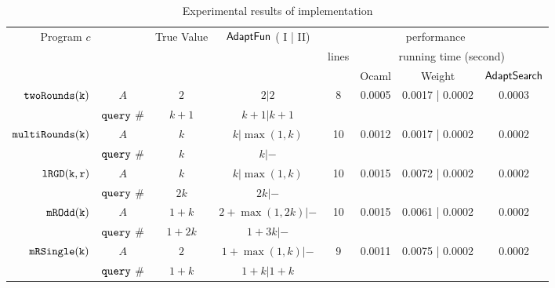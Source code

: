 
\begin {table}[H]
\vspace{-0.5cm}
    \caption{Experimental results of {\THESYSTEM} implementation}
    \vspace{-0.5cm}
        \label{tb:adapt-imp-detail}
        \begin{center}
        \centering
{\scriptsize
        \begin{tabular}{ r | c | c | c | c | c | c | c  }
        \multirow{3}{*}{Program $c$} & 
        \multirow{3}{*}{}
         & True Value
         & {$\textsf{AdaptFun}$ ( I | II)}
         & \multicolumn{4}{c}{performance} \\ 
         \cline{5-8}
         & & \multirow{2}{*}{ } & \multirow{2}{*}{} & \multirow{2}{*}{lines} & \multicolumn{3}{c}{running time (second)} \\ 
         \cline{6-8}
         & & & &  & Ocaml & Weight & $\mathsf{AdaptSearch}$  \\
         \hline \hline
         \multirow{2}{*}{$\mathtt{twoRounds(k)}$}  
         & $A$ &  $2$ & $2| 2$  & \multirow{2}{*}{8} & \multirow{2}{*}{0.0005} & \multirow{2}{*}{0.0017 | 0.0002} & \multirow{2}{*}{0.0003} \\
         \cline{2-4}
         & ${\tt query}$ \#   &  $k + 1$ & $k+1 | k+1$  & & & & \\
         \hline
         \multirow{2}{*}{$\mathtt{multiRounds(k)}$} 
         & $A$  &  $k$          & $k| \max(1,k)$  &  10 & 0.0012 & 0.0017 | 0.0002 & 0.0002 \\
         \cline{2-4}
         & ${\tt query}$ \#   & $k $ & $k | -$  & & & & \\
         \hline
         \multirow{2}{*}{$\mathtt{lRGD(k, r)}$}
         & $A$ & $k$ & $k | \max(1,k) $   &  10 & 0.0015 & 0.0072 | 0.0002 & 0.0002  \\
         \cline{2-4}
         & ${\tt query}$ \#   & $2k $ & $2k | -$  & & & & \\
         \hline
         $  \mathtt{mROdd(k)}$ 
         & $A$  &  $1 + k$ &  $2+\max(1,2k) | - $ &  10 & 0.0015 & 0.0061 | 0.0002 & 0.0002 \\
         \cline{2-4}
         & ${\tt query}$ \#   & $1+2k $ & $1 + 3k | - $  & & & & \\
         \hline
         $  \mathtt{mRSingle(k)}$  
         & $A$ & $2$ &  $1+ \max(1, k) | -$   &  9 & 0.0011 & 0.0075 | 0.0002 & 0.0002 \\
         \cline{2-4}
         & ${\tt query}$ \#   & $1 + k$ & $1 + k | 1 + k$ & & & & \\
         \hline

\end{tabular}}
\end{center}
\end{table}
